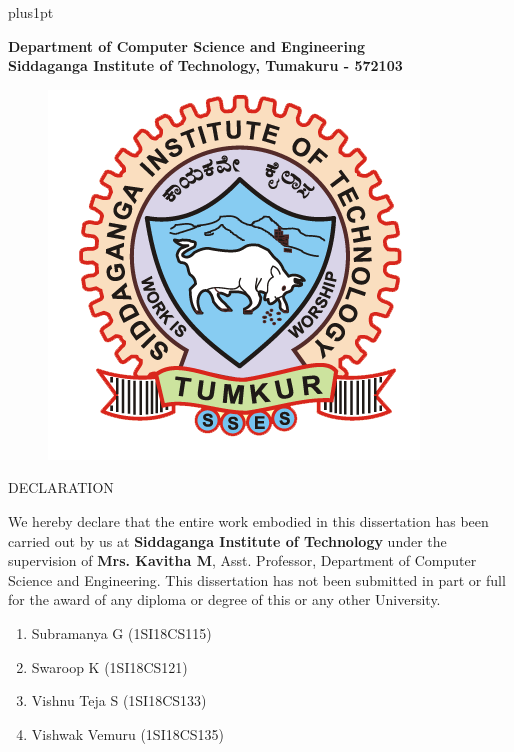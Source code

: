 \documentclass[oneside,12pt]{Classes/VTU}
\begin{document}
	\rfoot{\thepage}
	\cfoot{}
	
	\renewcommand\baselinestretch{1.2}
	\baselineskip=18pt plus1pt
	
	
	\setcounter{secnumdepth}{3}
	\setcounter{tocdepth}{3}
	
	
	\begin{center}
		\bfseries
		\large{Department of Computer Science and Engineering\\
			Siddaganga Institute of Technology, Tumakuru - 572103} \\
		\begin{figure}[hbtp]
			\centering
			\includegraphics[scale=1]{sit.png}
		\end{figure}
		\LARGE{DECLARATION} \\
	\end{center}
	\vspace{0.5in}
	\normalsize{
		We hereby declare that the entire work embodied in this dissertation has been carried out by us at \textbf{Siddaganga Institute of Technology} under the supervision of \textbf{Mrs. Kavitha M}, Asst. Professor, Department of Computer Science and Engineering. This dissertation has not been submitted in part or full for the award of any diploma or degree of this or any other University.} \\
	\vspace{0.5in}
	\begin{flushleft}
		\begin{enumerate}
			\item Subramanya G (1SI18CS115)
			\item Swaroop K (1SI18CS121)
			\item Vishnu Teja S (1SI18CS133)
			\item Vishwak Vemuru (1SI18CS135)
		\end{enumerate}
	\end{flushleft}
	
\end{document}
